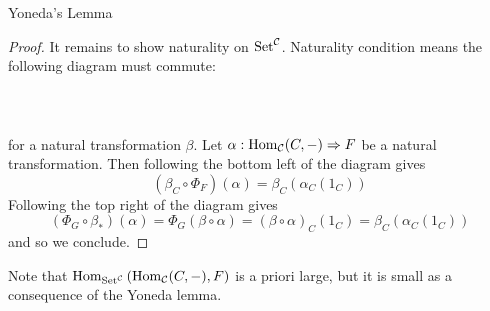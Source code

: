 \documentclass[a4paper]{article}
\begin{document}
\begin{thm}{Yoneda's Lemma}{}
\begin{proof}
It remains to show naturality on $\text{Set}^{\mathcal{C}}$. Naturality condition means the following diagram must commute: \\~\\
\\~\\
for a natural transformation $\beta$. Let $\alpha:\operatorname{Hom}_{\mathcal{C}}(C,-)\Rightarrow F$ be a natural transformation. Then following the bottom left of the diagram gives $$(\beta_C\circ\Phi_F)(\alpha)=\beta_C(\alpha_C(1_C))$$ Following the top right of the diagram gives $$(\Phi_G\circ\beta_\ast)(\alpha)=\Phi_G(\beta\circ\alpha)=(\beta\circ\alpha)_C(1_C)=\beta_C(\alpha_C(1_C))$$ and so we conclude. 
\end{proof}
\end{thm}

Note that $\operatorname{Hom}_{\text{Set}^{\mathcal{C}}}\left(\operatorname{Hom}_{\mathcal{C}}(C,-),F\right)$ is a priori large, but it is small as a consequence of the Yoneda lemma. 
\end{document}
